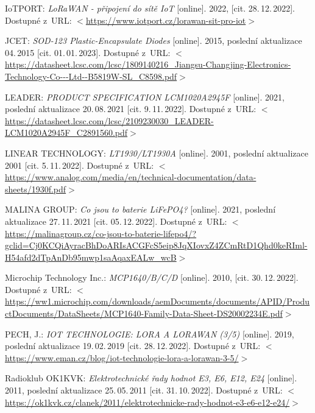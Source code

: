 \begin{thebibliography}{99}
    IoTPORT:
    \emph{LoRaWAN - připojení do sítě IoT}\/ [online].
    2022, [cit. 28.\,12.\,2022].
    Dostupné z~URL:
    \(<\)\url{https://www.iotport.cz/lorawan-sit-pro-iot}\(>\)
 
    JCET:
    \emph{SOD-123 Plastic-Encapsulate Diodes}\/ [online].
    2015, poslední aktualizace 04.\,2015 [cit. 01.\,01.\,2023]. 
    Dostupné z~URL:
    \(<\)\url{https://datasheet.lcsc.com/lcsc/1809140216_Jiangsu-Changjing-Electronics-Technology-Co---Ltd--B5819W-SL_C8598.pdf}\(>\)

    LEADER:
    \emph{PRODUCT SPECIFICATION LCM1020A2945F}\/ [online].
    2021, poslední aktualizace 20.\,08.\,2021 [cit. 9.\,11.\,2022].
    Dostupné z~URL: 
    \(<\)\url{https://datasheet.lcsc.com/lcsc/2109230030_LEADER-LCM1020A2945F_C2891560.pdf}\(>\)

    LINEAR TECHNOLOGY:
    \emph{LT1930/LT1930A}\/ [online].
    2001, poslední aktualizace 2001 [cit. 5.\,11.\,2022].
    Dostupné z~URL: 
    \(<\)\url{https://www.analog.com/media/en/technical-documentation/data-sheets/1930f.pdf}\(>\)

    MALINA GROUP:
    \emph{Co jsou to baterie LiFePO4?}\/ [online].
    2021, poslední aktualizace 27.\,11.\,2021 [cit. 05.\,12.\,2022].
    Dostupné z~URL:
    \(<\)\url{https://malinagroup.cz/co-jsou-to-baterie-lifepo4/?gclid=Cj0KCQiAyracBhDoARIsACGFcS5eip8JqXIovxZ4ZCmRtD1Qhd0keRIml-H54afd2dTpAnDb95mwp1saAqaxEALw_wcB}\(>\)

    Microchip Technology Inc.:
    \emph{MCP1640/B/C/D}\/ [online].
    2010, [cit. 30.\,12.\,2022].
    Dostupné z~URL: 
    \(<\)\url{https://ww1.microchip.com/downloads/aemDocuments/documents/APID/ProductDocuments/DataSheets/MCP1640-Family-Data-Sheet-DS20002234E.pdf}\(>\)

    PECH, J.:
    \emph{IOT TECHNOLOGIE: LORA A LORAWAN (3/5)}\/ [online].
    2019, poslední aktualizace 19.\,02.\,2019 [cit. 28.\,12.\,2022].
    Dostupné z~URL:
    \(<\)\url{https://www.eman.cz/blog/iot-technologie-lora-a-lorawan-3-5/}\(>\)

    Radioklub OK1KVK:
    \emph{Elektrotechnické řady hodnot E3, E6, E12, E24}\/ [online].
    2011, poslední aktualizace 25.\,05.\,2011 [cit. 31.\,10.\,2022].
    Dostupné z~URL: 
    \(<\)\url{https://ok1kvk.cz/clanek/2011/elektrotechnicke-rady-hodnot-e3-e6-e12-e24/}\(>\)


\end{thebibliography}
